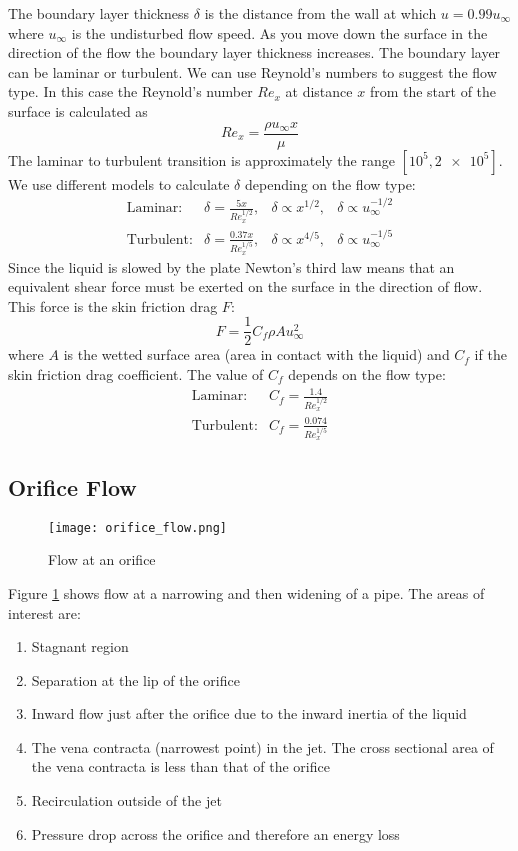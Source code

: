 \documentclass{article}
\begin{document}
    The boundary layer thickness \(\delta\) is the distance from the wall at which \(u=0.99 u_\infty\) where \(u_\infty\) is the undisturbed flow speed.
    As you move down the surface in the direction of the flow the boundary layer thickness increases.
    The boundary layer can be laminar or turbulent.
    We can use Reynold's numbers to suggest the flow type.
    In this case the Reynold's number \(Re_x\) at distance \(x\) from the start of the surface is calculated as
    \[Re_x = \frac{\rho u_\infty x}{\mu}\]
    The laminar to turbulent transition is approximately the range \([10^5, \num{2e5}]\).
    We use different models to calculate \(\delta\) depending on the flow type:
    \[
        \begin{array}{cccc}
            \text{Laminar:} & \delta = \frac{5x}{Re_x^{1/2}}, & \delta \propto x^{1/2}, & \delta \propto u_\infty^{-1/2}\\[0.5cm]
            \text{Turbulent:} & \delta = \frac{0.37x}{Re_x^{1/5}}, & \delta \propto x^{4/5}, & \delta \propto u_\infty^{-1/5}
        \end{array}
    \]
    Since the liquid is slowed by the plate Newton's third law means that an equivalent shear force must be exerted on the surface in the direction of flow.
    This force is the skin friction drag \(F\):
    \[F=\frac{1}{2}C_f\rho Au_\infty^2\]
    where \(A\) is the wetted surface area (area in contact with the liquid) and \(C_f\) if the skin friction drag coefficient. 
    The value of \(C_f\) depends on the flow type:
    \[
        \begin{array}{cc}
            \text{Laminar:} & C_f = \frac{1.4}{Re_x^{1/2}}\\[0.5cm]
            \text{Turbulent:} & C_f = \frac{0.074}{Re_x^{1/5}}
        \end{array}
    \]
    
    \subsection{Orifice Flow}
    \begin{figure}[ht]
        \centering
        \texttt{[image: orifice\_flow.png]}
        \caption{Flow at an orifice}
        \label{fig:orifice flow}
    \end{figure}
    Figure \ref{fig:orifice flow} shows flow at a narrowing and then widening of a pipe. 
    The areas of interest are:
    \begin{enumerate}
        \item Stagnant region
        \item Separation at the lip of the orifice
        \item Inward flow just after the orifice due to the inward inertia of the liquid
        \item The vena contracta (narrowest point) in the jet. The cross sectional area of the vena contracta is less than that of the orifice
        \item Recirculation outside of the jet
        \item Pressure drop across the orifice and therefore an energy loss
    \end{enumerate}
\end{document}
